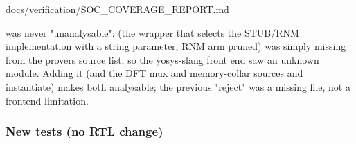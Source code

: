 \begin{relocated}{docs/verification/SOC_COVERAGE_REPORT.md}
{}

 was never "unanalysable":  (the
wrapper that selects the STUB/RNM implementation with a string
parameter, RNM arm pruned) was simply missing from the
prover\textquotesingle s source list, so the yosys-slang front end saw
an unknown module. Adding it (and the DFT mux and memory-collar sources
 and  instantiate) makes both
analysable; the previous "reject" was a missing file, not a frontend
limitation.

\subsubsection{New tests (no RTL change)}\label{tm:flow:soc-coverage-report:new-tests-no-rtl-change-1}

{\footnotesize\setlength{\tabcolsep}{3pt}

}
\end{relocated}
